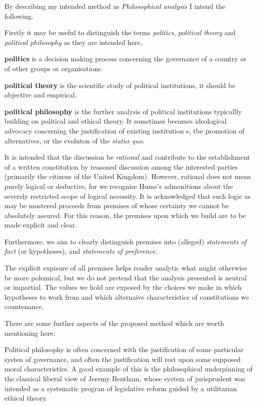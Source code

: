 \documentclass[10pt,titlepage]{book}
\begin{document}
By describing my intended method as {\it Philosophical analysis} I intend the following.

  Firstly it may be useful to distinguish the terms {\it politics}, {\it political theory} and {\it political philosophy} as they are intended here.

  \begin{description}
  \item{\bf politics} is a decision making process concerning the governance of a country or of other groups or organisations.
  \item{\bf political theory} is the scientific study of political institutions, it should be objective and empirical.
  \item{\bf political philosophy} is the further analysis of political institutions typicallly building on political and ethical theory.
    It sometimes becomes ideological advocacy concerning the justification of existing institution s, tbe promotion of alternatives, or the evoluton of the {\it status quo}.
  \end{description}

  It is intended that the discussion be {\it rational} and contribute to the establishment of a written constitution by reasoned discussion among the interested parties (primarily the citizens of the United Kingdom).
  However, rational does not mean purely logical or deductive, for we recognise Hume's admonitions about the severely restricted scope of logical necessity.
  It is acknowledged that such logic as may be mustered proceeds from premises of whose certainty we cannot be absolutely assured.
  For this reason, the premises upon which we build are to be made explicit and clear.

  Furthermore, we aim to clearly distinguish premises into (alleged) {\it statements of fact} (or hypotheses), and {\it statements of preference}.

  The explicit expisure of all premises helps render analytic what might otherwise be more polemical, but we do not pretend that the analysis presented is neutral or impartial.
  The values we hold are exposed by the choices we make in which hypotheses to work from and which alternaive characteristics of constitutions we countenance.

  There are some further aspects of the proposed method which are worth mentioning here.

  Political philosophy is often concerned with the justification of some particular systen of governance, and often the justification will rest upon some supposed moral characteristics.
  A good example of this is the philosophical underpinning of the classical liberal view of Jeremy Bentham, whose system of jurisprudent was intended as a systematic progran of legislative reform guided by a utilitarian ethical theory.
\end{document}
